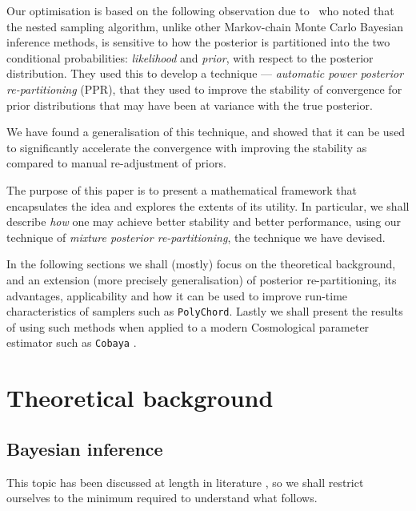 \documentclass[usenatbib]{mnras}
\begin{document}
Our optimisation is based on the following observation due
to~\cite{chen-ferroz-hobson} who noted that the nested sampling
algorithm, unlike other Markov-chain Monte Carlo Bayesian inference
methods, is sensitive to how the posterior is partitioned into the two
conditional probabilities: \emph{likelihood} and \emph{prior}, with
respect to the posterior distribution. They used this to develop a
technique --- \emph{automatic power posterior re-partitioning} (PPR),
that they used to improve the stability of convergence for prior
distributions that may have been at variance with the true posterior.

We have found a generalisation of this technique, and showed that it
can be used to significantly accelerate the convergence with
improving the stability as compared to manual re-adjustment of
priors.

The purpose of this paper is to present a mathematical framework
that encapsulates the idea and explores the extents of its
utility. In particular, we shall describe \emph{how} one may achieve
better stability and better performance, using our technique of
\emph{mixture posterior re-partitioning}, the technique we have devised.

In the following sections we shall (mostly) focus on the theoretical
background, and an extension (more precisely generalisation) of
posterior re-partitioning, its advantages, applicability and how it
can be used to improve run-time characteristics of samplers such as
\texttt{PolyChord}. Lastly we shall present the results of using such methods
when applied to a modern Cosmological parameter estimator such as
\texttt{Cobaya} \citep{cobaya}.

\section{Theoretical background}\label{sec:orge6061a4}

\subsection{Bayesian inference}\label{sec:org6b7d2fe}

This topic has been discussed at length in literature
\citep{jeffreys2010scientific}, so we shall restrict ourselves to the
minimum required to understand what follows.
\end{document}
